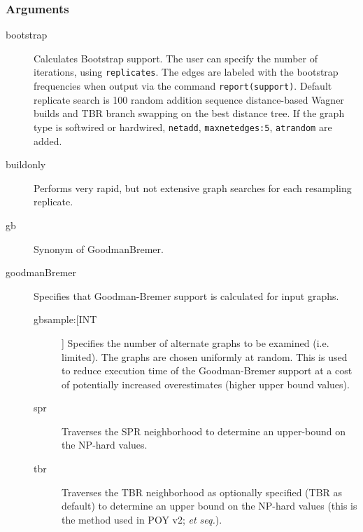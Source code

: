 	\subsubsection{Arguments}
		\begin{description}
		

		\item[bootstrap] Calculates Bootstrap support. The user can specify the number of 
		iterations, using \texttt{replicates}. The edges are labeled with the bootstrap 
		frequencies when output via the command \texttt{report(support)}. Default replicate 
		search is 100 random addition sequence distance-based Wagner builds and TBR 
		branch swapping on the best distance tree. If the graph type is softwired or hardwired, 
		\texttt{netadd}, \texttt{maxnetedges:5}, \texttt{atrandom} are added. 
		
		\item[buildonly] Performs very rapid, but not extensive graph searches for each 
		resampling replicate.
		
		\item[gb] Synonym of GoodmanBremer.
			
		\item[goodmanBremer] Specifies that Goodman-Bremer support is 
		calculated for input graphs. 
			
		\begin{description}
			
			\item[gbsample:[INT]] Specifies the number of alternate graphs to be examined 
			(i.e. limited). The graphs are chosen uniformly at random.  This is used to reduce 
			execution time of the Goodman-Bremer support at a cost of potentially increased 
			overestimates (higher upper bound values). 
			
			\item[spr] Traverses the SPR neighborhood to determine an upper-bound on 
			the NP-hard values.
			
			\item[tbr] Traverses the TBR neighborhood 
			as optionally specified (TBR as default) to determine an upper bound on the NP-hard 
			values (this is the method used in POY v2; \citealp{POY2} \textit{et seq.}).
			
		\end{description}
		

\end{description}
